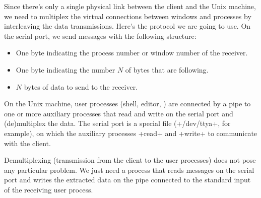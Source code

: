 Since there's only a single physical link between the client and the
Unix machine, we need to multiplex the virtual connections between
windows and processes by interleaving the data transmissions.
Here's the protocol we are going to use. On the serial port, we send
messages with the following structure: 
%
\begin{itemize}
\item One byte indicating the process number or window number of the receiver.
\item One byte indicating the number $N$ of bytes that are following.
\item $N$ bytes of data to send to the receiver.
\end{itemize}
% 
On the Unix machine, user processes (shell, editor, \etc) are
connected by a pipe to one or more auxiliary processes that read and
write on the serial port and (de)multiplex the data. The serial port
is a special file (\ml+/dev/ttya+, for example), on which the
auxiliary processes \ml+read+ and \ml+write+ to communicate with the 
client.

Demultiplexing (transmission from the client to the user processes)
does not pose any particular problem. We just need a process that reads
messages on the serial port and writes the extracted data on the pipe
connected to the standard input of the receiving user process.
%


